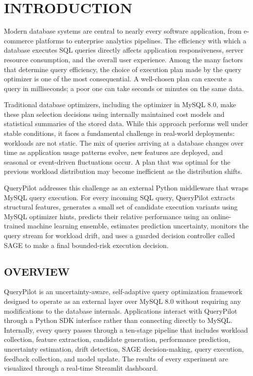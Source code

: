 
\chapter{INTRODUCTION}
\label{chap:introduction}

Modern database systems are central to nearly every software application, from
e-commerce platforms to enterprise analytics pipelines. The efficiency with
which a database executes SQL queries directly affects application
responsiveness, server resource consumption, and the overall user experience.
Among the many factors that determine query efficiency, the choice of execution
plan made by the query optimizer is one of the most consequential. A
well-chosen plan can execute a query in milliseconds; a poor one can take
seconds or minutes on the same data.

Traditional database optimizers, including the optimizer in MySQL 8.0, make
these plan selection decisions using internally maintained cost models and
statistical summaries of the stored data. While this approach performs well
under stable conditions, it faces a fundamental challenge in real-world
deployments: workloads are not static. The mix of queries arriving at a
database changes over time as application usage patterns evolve, new features
are deployed, and seasonal or event-driven fluctuations occur. A plan that was
optimal for the previous workload distribution may become inefficient as the
distribution shifts.

QueryPilot addresses this challenge as an external Python middleware that wraps
MySQL query execution. For every incoming SQL query, QueryPilot extracts
structural features, generates a small set of candidate execution variants
using MySQL optimizer hints, predicts their relative performance using an
online-trained machine learning ensemble, estimates prediction uncertainty,
monitors the query stream for workload drift, and uses a guarded decision
controller called SAGE to make a final bounded-risk execution decision.

\section{OVERVIEW}
\label{sec:overview}

QueryPilot is an uncertainty-aware, self-adaptive query optimization framework
designed to operate as an external layer over MySQL 8.0 without requiring any
modifications to the database internals. Applications interact with QueryPilot
through a Python SDK interface rather than connecting directly to MySQL.
Internally, every query passes through a ten-stage pipeline that includes
workload collection, feature extraction, candidate generation, performance
prediction, uncertainty estimation, drift detection, SAGE decision-making,
query execution, feedback collection, and model update. The results of every
experiment are visualized through a real-time Streamlit dashboard.

